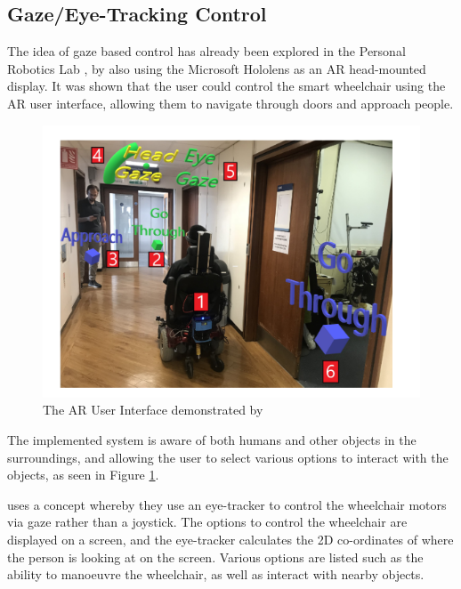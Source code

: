 \documentclass[12pt,a4paper]{report}
\begin{document}
\subsection{Gaze/Eye-Tracking Control}
The idea of gaze based control has already been explored in the Personal Robotics Lab \citep{Chacon-Quesada}, by also using the Microsoft Hololens as an AR head-mounted display. It was shown that the user could control the smart wheelchair using the AR user interface, allowing them to navigate through doors and approach people.

\begin{figure}[h!]
	\begin{center}
		\includegraphics[scale=0.4]{Images/Literature/AR_Interface.png}
		\caption{The AR User Interface demonstrated by  \cite{Chacon-Quesada}}
		\label{fig:Chacon_AR}
		
	\end{center}
	
\end{figure}

The implemented system is aware of both humans and other objects in the surroundings, and allowing the user to select various options to interact with the objects, as seen in Figure \ref{fig:Chacon_AR}.


\cite{H.Montenegro-Couto2018} uses a concept whereby they use an eye-tracker to control the wheelchair motors via gaze rather than a joystick. The options to control the wheelchair are displayed on a screen, and the eye-tracker calculates the 2D co-ordinates of where the person is looking at on the screen. Various options are listed such as the ability to manoeuvre the wheelchair, as well as interact with nearby objects.
\end{document}
